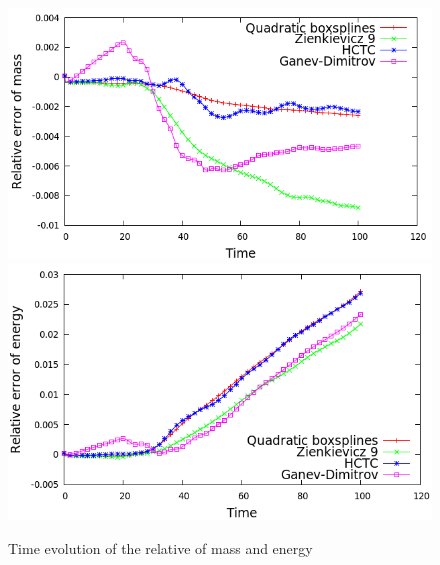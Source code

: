 \documentclass[proc]{edpsmath}
\begin{document}
\begin{figure}[h!]
	\includegraphics[scale=0.3]{figures/mass_cg.png}
	\includegraphics[scale=0.3]{figures/energy_cg.png}
	\caption{Time evolution of the relative of mass and energy}
\end{figure}
\end{document}

